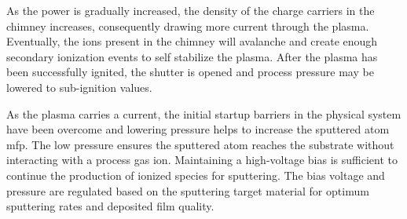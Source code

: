 \documentclass[../../../main.tex]{subfiles}
\begin{document}
    As the power is gradually increased, the density of the charge carriers in the chimney increases, consequently drawing more current through the plasma.
    Eventually, the ions present in the chimney will avalanche and create enough secondary ionization events to self stabilize the plasma. 
    After the plasma has been successfully ignited, the shutter is opened and process pressure may be lowered to sub-ignition values.
    \par%
    As the plasma carries a current, the initial startup barriers in the physical system have been overcome and lowering pressure helps to increase the sputtered atom \gls{mfp}.
    The low pressure ensures the sputtered atom reaches the substrate without interacting with a process gas ion.
    Maintaining a \gls{high-voltage} bias is sufficient to continue the production of ionized species for sputtering.
    The bias voltage and pressure are regulated based on the sputtering target material for optimum sputtering rates and deposited film quality.
\end{document}
